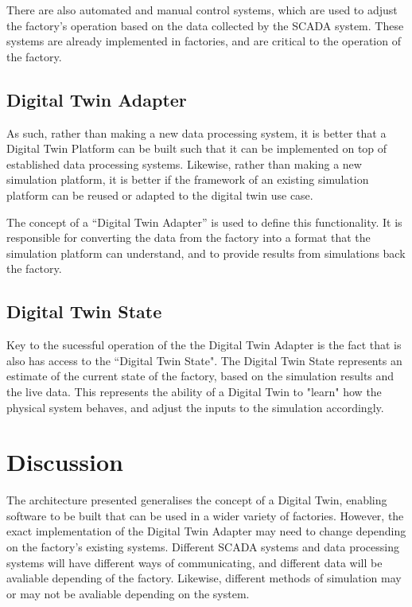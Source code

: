 There are also automated and manual control systems, which are used to adjust the factory's operation based on the data collected by the SCADA system.
These systems are already implemented in factories, and are critical to the operation of the factory.

\subsection{Digital Twin Adapter}

As such, rather than making a new data processing system, it is better that a Digital Twin Platform can be built such that it can be implemented on top of established data processing systems. Likewise, rather than making a new simulation platform, it is better if the framework of an existing simulation platform can be reused or adapted to the digital twin use case.

The concept of a ``Digital Twin Adapter'' is used to define this functionality. It is responsible for converting the data from the factory into a format that the simulation platform can understand, and to provide results from simulations back the factory.


\subsection{Digital Twin State}

Key to the sucessful operation of the the Digital Twin Adapter is the fact that is also has access to the ``Digital Twin State". The Digital Twin State represents an estimate of the current state of the factory, based on the simulation results and the live data. 
This represents the ability of a Digital Twin to "learn" how the physical system behaves, and adjust the inputs to the simulation accordingly.



\section{Discussion} \label{sec:researchconclusions}

The architecture presented generalises the concept of a Digital Twin, enabling software to be built that can be used in a wider variety of factories. However, the exact implementation of the Digital Twin Adapter may need to change depending on the factory's existing systems. Different SCADA systems and data processing systems will have different ways of communicating, and different data will be avaliable depending of the factory. Likewise, different methods of simulation may or may not be avaliable depending on the system. 

